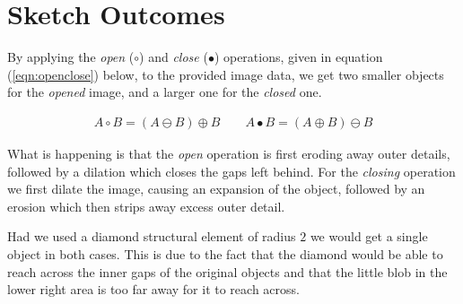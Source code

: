 %
%

\section{Sketch Outcomes}
By applying the {\it open} ($\circ$) and {\it close} ($\bullet$) operations,
given in equation (\ref{eqn:openclose}) below, to the provided image data, we
get two smaller objects for the {\it opened} image, and a larger one for the
{\it closed} one.

\begin{align}
    A \circ B = (A \ominus B) \oplus B
    \qquad
    A \bullet B = (A \oplus B) \ominus B
    \label{eqn:openclose}
\end{align}

What is happening is that the {\it open} operation is first eroding away outer
details, followed by a dilation which closes the gaps left behind. For the
{\it closing} operation we first dilate the image, causing an expansion of the
object, followed by an erosion which then strips away excess outer detail.


Had we used a diamond structural element of radius $2$ we would get a single
object in both cases. This is due to the fact that the diamond would be able
to reach across the inner gaps of the original objects and that the little
blob in the lower right area is too far away for it to reach across.

